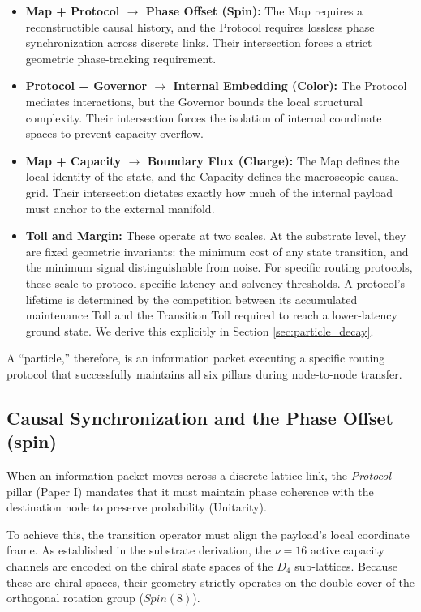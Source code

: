 \begin{itemize}
    \item \textbf{Map + Protocol $\rightarrow$ Phase Offset (Spin):} The Map requires a reconstructible causal history, and the Protocol requires lossless phase synchronization across discrete links. Their intersection forces a strict geometric phase-tracking requirement.
    \item \textbf{Protocol + Governor $\rightarrow$ Internal Embedding (Color):} The Protocol mediates interactions, but the Governor bounds the local structural complexity. Their intersection forces the isolation of internal coordinate spaces to prevent capacity overflow.
    \item \textbf{Map + Capacity $\rightarrow$ Boundary Flux (Charge):} The Map defines the local identity of the state, and the Capacity defines the macroscopic causal grid. Their intersection dictates exactly how much of the internal payload must anchor to the external manifold.
    \item \textbf{Toll and Margin:} These operate at two scales. At the substrate level, they are fixed geometric invariants: the minimum cost of any state transition, and the minimum signal distinguishable from noise. For specific routing protocols, these scale to protocol-specific latency and solvency thresholds. A protocol's lifetime is determined by the competition between its accumulated maintenance Toll and the Transition Toll required to reach a lower-latency ground state. We derive this explicitly in Section \cref{sec:particle_decay}.
\end{itemize}

A ``particle,'' therefore, is an information packet executing a specific routing protocol that successfully maintains all six pillars during node-to-node transfer. 

\subsection{Causal Synchronization and the Phase Offset (spin)}

When an information packet moves across a discrete lattice link, the \textit{Protocol} pillar (Paper I) mandates that it must maintain phase coherence with the destination node to preserve probability (Unitarity). 

To achieve this, the transition operator must align the payload's local coordinate frame. As established in the substrate derivation, the $\nu=16$ active capacity channels are encoded on the chiral state spaces of the $D_4$ sub-lattices. Because these are chiral spaces, their geometry strictly operates on the double-cover of the orthogonal rotation group ($Spin(8)$). 

